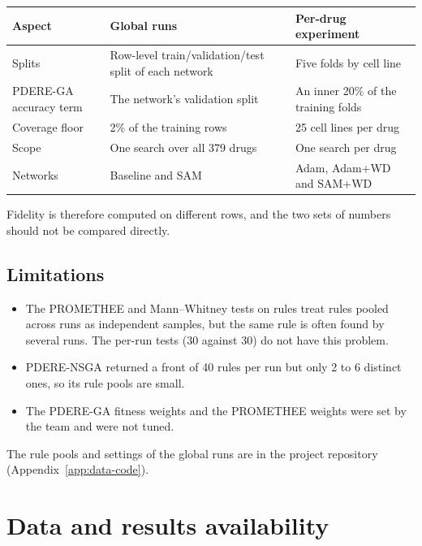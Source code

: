 \begin{appendices}
\begin{table}[H]
\centering
\small
\begin{tabularx}{\textwidth}{@{}lYY@{}}
\toprule
\textbf{Aspect} & \textbf{Global runs} & \textbf{Per-drug experiment} \\
\midrule
Splits & Row-level train/validation/test split of each network & Five folds by cell line \\
PDERE-GA accuracy term & The network's validation split & An inner 20\% of the training folds \\
Coverage floor & 2\% of the training rows & 25 cell lines per drug \\
Scope & One search over all 379 drugs & One search per drug \\
Networks & Baseline and SAM & Adam, Adam+WD and SAM+WD \\
\bottomrule
\end{tabularx}
\end{table}

Fidelity is therefore computed on different rows, and the two sets of numbers should not be compared directly.

\subsection{Limitations}
\label{app:global-limits}

\begin{itemize}
  \item The PROMETHEE and Mann--Whitney tests on rules treat rules pooled across runs as independent samples, but the same rule is often found by several runs. The per-run tests (30 against 30) do not have this problem.
  \item PDERE-NSGA returned a front of 40 rules per run but only 2 to 6 distinct ones, so its rule pools are small.
  \item The PDERE-GA fitness weights and the PROMETHEE weights were set by the team and were not tuned.
\end{itemize}

The rule pools and settings of the global runs are in the project repository (Appendix~\ref{app:data-code}).

\section{Data and results availability}
\label{app:data}


\end{appendices}
